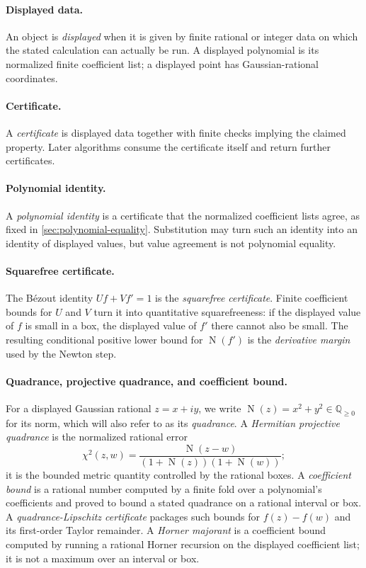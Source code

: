 \documentclass[11pt]{article}
\newcommand{\Q}{\mathbb{Q}}
\newcommand{\Norm}[1]{\operatorname{N}\!\left(#1\right)}
\begin{document}
\paragraph{Displayed data.}
An object is \emph{displayed} when it is given by finite rational or integer
data on which the stated calculation can actually be run.  A displayed
polynomial is its normalized finite coefficient list; a displayed point has
Gaussian-rational coordinates.

\paragraph{Certificate.}
A \emph{certificate} is displayed data together with finite checks implying
the claimed property.  Later algorithms consume the certificate itself and
return further certificates.

\paragraph{Polynomial identity.}
A \emph{polynomial identity} is a certificate that the normalized
coefficient lists agree, as fixed in \cref{sec:polynomial-equality}.
Substitution may turn such an identity into an
identity of displayed values, but value agreement is not polynomial
equality.

\paragraph{Squarefree certificate.}
The B\'ezout identity $Uf+Vf'=1$ is the \emph{squarefree certificate}.  Finite
coefficient bounds for $U$ and $V$ turn it into quantitative squarefreeness:
if the displayed value of $f$ is small in a box, the displayed value of
$f'$ there cannot also be small.  The resulting conditional positive lower
bound for $\Norm{f'}$ is the \emph{derivative margin} used by the Newton step.

\paragraph{Quadrance, projective quadrance, and coefficient bound.}
For a displayed Gaussian rational $z=x+iy$, we write
$\Norm z=x^2+y^2\in\Q_{\ge0}$ for its norm, which will also refer to as its \emph{quadrance}. A
\emph{Hermitian projective quadrance} is the normalized rational error
\[
             \chi^2(z,w)=
             \frac{\Norm{z-w}}{(1+\Norm z)(1+\Norm w)};
\]
it is the bounded metric quantity controlled by the rational boxes.  A
\emph{coefficient bound} is a rational number computed by a finite fold over
a polynomial's coefficients and proved to bound a stated quadrance on a
rational interval or box.  A \emph{quadrance-Lipschitz certificate} packages
such bounds for $f(z)-f(w)$ and its first-order Taylor remainder.  A
\emph{Horner majorant} is a coefficient bound computed by running a rational
Horner recursion on the displayed coefficient list; it is not a maximum over
an interval or box.
\end{document}
